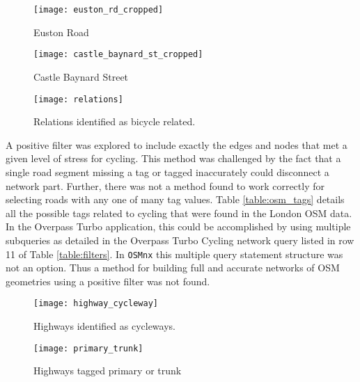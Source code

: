 \begin{figure}
\centering
\texttt{[image: euston\_rd\_cropped]}
\caption{Euston Road}
\label{fig:euston}
\end{figure}

\begin{figure}
  \centering
  \texttt{[image: castle\_baynard\_st\_cropped]}
  \caption{Castle Baynard Street}
  \label{fig:baynard}
\end{figure}

\begin{figure}
\centering
\texttt{[image: relations]}
\caption{Relations identified as bicycle related.}
\label{fig:bicycle_relation}
\end{figure}

A positive filter was explored to include exactly the edges and nodes that met a given level of stress for cycling. This method was challenged by the fact that a single road segment missing a tag or tagged inaccurately could disconnect a network part. Further, there was not a method found to work correctly for selecting roads with any one of many tag values.  Table \ref{table:osm_tags} details all the possible tags related to cycling that were found in the London OSM data.  In the Overpass Turbo application, this could be accomplished by using multiple subqueries as detailed in the Overpass Turbo Cycling network query listed in row 11 of Table \ref{table:filters}. In \texttt{OSMnx} this multiple query statement structure was not an option. Thus a method for building full and accurate networks of OSM geometries using a positive filter was not found. 

\begin{figure}
\centering
\texttt{[image: highway\_cycleway]}
\caption{Highways identified as cycleways.}
\label{fig:highway_cycleway}
\end{figure}


\begin{figure}
\centering
\texttt{[image: primary\_trunk]}
\caption{Highways tagged primary or trunk}
\label{fig:primary_trunk}
\end{figure}

